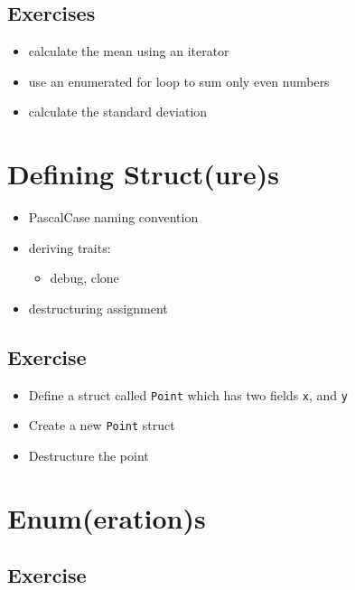 \documentclass[
  letterpaper,
  DIV=11,
  numbers=noendperiod,
  oneside]{scrreprt}
\providecommand{\tightlist}{%
  \setlength{\itemsep}{0pt}\setlength{\parskip}{0pt}}\usepackage{longtable,booktabs,array}
\begin{document}
\section{Exercises}\label{exercises}

\begin{itemize}
\tightlist
\item
  calculate the mean using an iterator
\item
  use an enumerated for loop to sum only even numbers
\item
  calculate the standard deviation
\end{itemize}

\chapter{Defining Struct(ure)s}\label{defining-structures}

\begin{itemize}
\tightlist
\item
  PascalCase naming convention
\item
  deriving traits:

  \begin{itemize}
  \tightlist
  \item
    debug, clone
  \end{itemize}
\item
  destructuring assignment
\end{itemize}

\section{Exercise}\label{exercise-8}

\begin{itemize}
\tightlist
\item
  Define a struct called \texttt{Point} which has two fields \texttt{x},
  and \texttt{y}
\item
  Create a new \texttt{Point} struct
\item
  Destructure the point
\end{itemize}

\chapter{Enum(eration)s}\label{enumerations}

\section{Exercise}\label{exercise-9}
\end{document}
